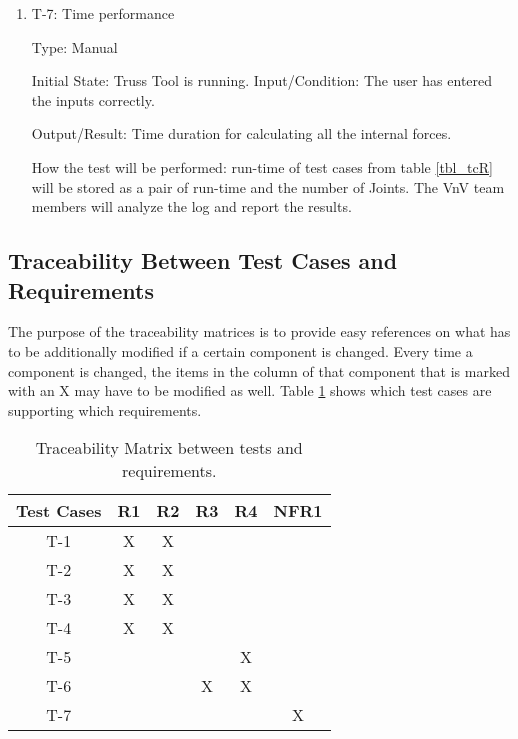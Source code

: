 \documentclass[12pt, titlepage]{article}
\begin{document}
\begin{enumerate}

\item{T-7: Time performance\\}

Type: Manual
					
Initial State: Truss Tool is running.					
Input/Condition: The user has entered the inputs correctly.

					
Output/Result: Time duration for calculating all the internal forces.
					
How the test will be performed: run-time of test cases from table \ref{tbl_tcR}  will be stored as a pair of run-time and the number of Joints. The VnV team members will analyze the log and report the results.

	

\end{enumerate}

\subsection{Traceability Between Test Cases and Requirements}
The purpose of the traceability matrices is to provide easy references on what has to be additionally modified if a certain component is changed. Every time a component is changed, the items in the column of that component that is marked with an X may have to be modified as well. Table \ref{tbl_tr_TC} shows which test cases are supporting which requirements.


\begin{table} [h!]
\centering
\begin{tabular}{|c|c| c| c| c | c |}
\hline
Test Cases & R1 & R2 & R3& R4& NFR1  \\
 \hline   
 T-1 & X&X & & &  \\
 \hline
  T-2   & X& X& & &  \\
 \hline
  T-3   &X & X& & &  \\
 \hline
  T-4  &X &X & & &  \\
 \hline
  T-5  & & & &X &  \\
 \hline
  T-6  & & & X&X &  \\
 \hline
  T-7  & & & & & X \\
 \hline
 
\end{tabular}
\caption{\label{tbl_tr_TC}Traceability Matrix between tests and requirements.}
\end{table}
\end{document}
